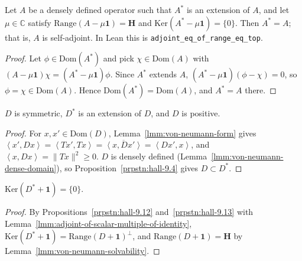 \begin{lemma}
    \label{lmm:self-adjoint-of-range-eq-top}
    \leanok
    Let $A$ be a densely defined operator such that $A^*$ is an extension of $A$, and let $\mu \in \mathbb{C}$ satisfy $\text{Range}(A - \mu\mathbf{1}) = \mathbf{H}$ and $\text{Ker}(A^* - \mu\mathbf{1}) = \{0\}$. Then $A^* = A$; that is, $A$ is self-adjoint. In Lean this is \texttt{adjoint\_eq\_of\_range\_eq\_top}.
\end{lemma}
\begin{proof}
    \leanok
    Let $\phi \in \text{Dom}(A^*)$ and pick $\chi \in \text{Dom}(A)$ with $(A - \mu\mathbf{1})\chi = (A^* - \mu\mathbf{1})\phi$. Since $A^*$ extends $A$, $(A^* - \mu\mathbf{1})(\phi - \chi) = 0$, so $\phi = \chi \in \text{Dom}(A)$. Hence $\text{Dom}(A^*) = \text{Dom}(A)$, and $A^* = A$ there.
\end{proof}

\begin{lemma}
    \label{lmm:von-neumann-symmetric-positive}
    \leanok
    $D$ is symmetric, $D^*$ is an extension of $D$, and $D$ is positive.
\end{lemma}
\begin{proof}
    \leanok
    For $x, x' \in \text{Dom}(D)$, Lemma~\ref{lmm:von-neumann-form} gives $\left< x', Dx \right> = \left< Tx', Tx \right> = \overline{\left< x, Dx' \right>} = \left< Dx', x \right>$, and $\left< x, Dx \right> = \|Tx\|^2 \ge 0$. $D$ is densely defined (Lemma~\ref{lmm:von-neumann-dense-domain}), so Proposition~\ref{prpstn:hall-9.4} gives $D \subset D^*$.
\end{proof}

\begin{lemma}
    \label{lmm:von-neumann-kernel}
    \leanok
    $\text{Ker}(D^* + \mathbf{1}) = \{0\}$.
\end{lemma}
\begin{proof}
    \leanok
    By Propositions~\ref{prpstn:hall-9.12} and~\ref{prpstn:hall-9.13} with Lemma~\ref{lmm:adjoint-of-scalar-multiple-of-identity}, $\text{Ker}(D^* + \mathbf{1}) = \text{Range}(D + \mathbf{1})^\perp$, and $\text{Range}(D + \mathbf{1}) = \mathbf{H}$ by Lemma~\ref{lmm:von-neumann-solvability}.
\end{proof}

